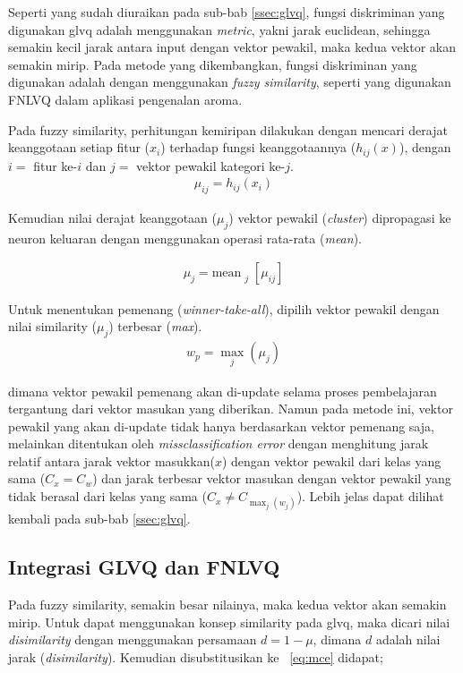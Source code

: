 Seperti yang sudah diuraikan pada sub-bab \ref{ssec:glvq}, fungsi
diskriminan yang digunakan \gls{glvq} adalah menggunakan \emph{\gls{metric}}, 
yakni jarak euclidean, sehingga semakin kecil jarak antara input dengan vektor
pewakil, maka kedua vektor akan semakin mirip. Pada metode yang dikembangkan,
fungsi diskriminan yang digunakan adalah dengan menggunakan \emph{fuzzy similarity},
seperti yang digunakan \gls{FNLVQ} dalam aplikasi pengenalan aroma.


Pada fuzzy similarity, perhitungan kemiripan dilakukan dengan mencari derajat
keanggotaan setiap fitur ($x_i$) terhadap fungsi keanggotaannya ($h_{ij}(x)$), 
dengan $i=$ fitur ke-$i$ dan $j=$ vektor pewakil kategori ke-$j$.
\begin{align}
	\mu_{ij} = h_{ij}(x_i)
\end{align}

Kemudian nilai derajat keanggotaan ($\mu_{j}$) vektor pewakil
(\emph{cluster}) dipropagasi ke neuron keluaran dengan menggunakan operasi
rata-rata (\emph{mean}).

\begin{align}
	\mu_j = \text{mean}_{\substack{j}} [\mu_{ij}]
\end{align}

Untuk menentukan pemenang (\emph{winner-take-all}), dipilih vektor
pewakil dengan nilai similarity ($\mu_j$) terbesar (\emph{max}).  
\begin{align}
	w_p = \max_j ( \mu_j )
\end{align}

dimana vektor pewakil pemenang akan di-update selama proses pembelajaran 
tergantung dari vektor masukan yang diberikan. Namun pada metode ini, vektor
pewakil yang akan di-update tidak hanya berdasarkan vektor pemenang saja,
melainkan ditentukan oleh \emph{missclassification error} dengan menghitung
jarak relatif antara jarak vektor masukkan($x$) dengan vektor pewakil dari
kelas yang sama ($C_x = C_w$) dan jarak terbesar vektor masukan dengan vektor
pewakil yang tidak berasal dari kelas yang sama ($C_x \neq C_{\max_{j}(w_j)}$).
Lebih jelas dapat dilihat kembali pada sub-bab \ref{ssec:glvq}.

\subsection{Integrasi GLVQ dan FNLVQ}
Pada fuzzy similarity, semakin besar nilainya, maka kedua vektor akan semakin
mirip. Untuk dapat menggunakan konsep similarity pada \gls{glvq}, maka dicari
nilai \emph{disimilarity}  dengan menggunakan persamaan $d = 1 - \mu$, dimana
$d$ adalah nilai jarak (\emph{disimilarity}). Kemudian disubstitusikan ke
\equ~\ref{eq:mce} didapat;

